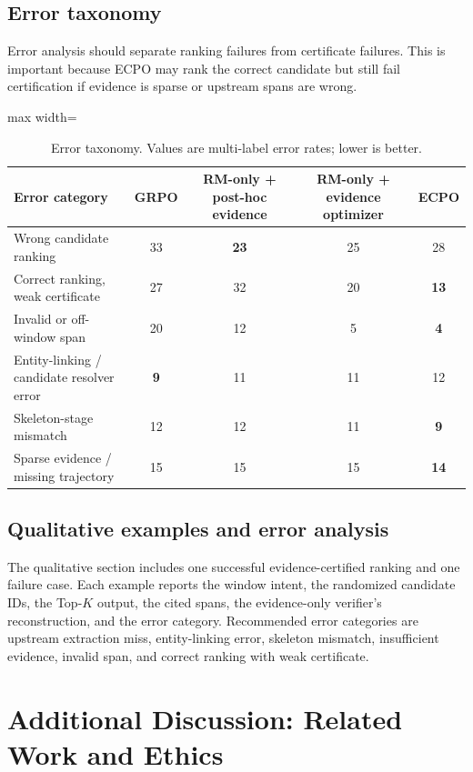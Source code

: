\documentclass{article}
\begin{document}
\subsection{Error taxonomy}
\label{sec:app_error_taxonomy}
Error analysis should separate ranking failures from certificate failures. This is important because ECPO may rank the correct candidate but still fail certification if evidence is sparse or upstream spans are wrong.

\begin{table}[h]
\centering
\caption{Error taxonomy. Values are multi-label error rates; lower is better.}
\label{tab:error_taxonomy}
\small
\begin{adjustbox}{max width=\linewidth}
\begin{tabular}{l c c c c}
\toprule
Error category & GRPO & RM-only + post-hoc evidence & RM-only + evidence optimizer & ECPO \\
\midrule
Wrong candidate ranking & 33 & \textbf{23} & 25 & 28 \\
Correct ranking, weak certificate & 27 & 32 & 20 & \textbf{13} \\
Invalid or off-window span & 20 & 12 & 5 & \textbf{4} \\
Entity-linking / candidate resolver error & \textbf{9} & 11 & 11 & 12 \\
Skeleton-stage mismatch & 12 & 12 & 11 & \textbf{9} \\
Sparse evidence / missing trajectory & 15 & 15 & 15 & \textbf{14} \\
\bottomrule
\end{tabular}
\end{adjustbox}
\end{table}

\subsection{Qualitative examples and error analysis}
\label{sec:app_qual}

The qualitative section includes one successful evidence-certified ranking and one failure case. Each example reports the window intent, the randomized candidate IDs, the Top-$K$ output, the cited spans, the evidence-only verifier's reconstruction, and the error category. Recommended error categories are upstream extraction miss, entity-linking error, skeleton mismatch, insufficient evidence, invalid span, and correct ranking with weak certificate.

\section{Additional Discussion: Related Work and Ethics}
\label{sec:app_additional_discussion}
\end{document}

